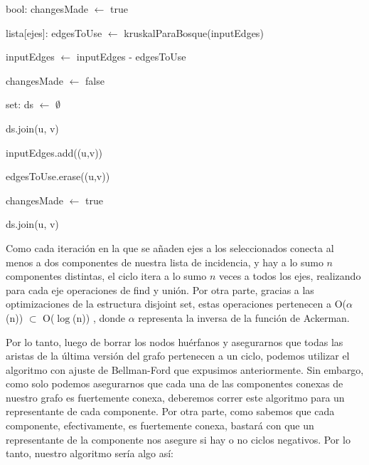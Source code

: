 \begin{algorithm}[H]
		\NoCaptionOfAlgo
		\caption{}
		
		bool: changesMade $\leftarrow$ true
		
		lista[ejes]: edgesToUse $\leftarrow$ kruskalParaBosque(inputEdges)

		inputEdges $\leftarrow$ inputEdges - edgesToUse

		{
			changesMade $\leftarrow$ false

			set: ds $\leftarrow$ $\emptyset$

			{
				ds.join(u, v)
			}

			{
					{
						inputEdges.add((u,v))

						edgesToUse.erase((u,v))

						changesMade $\leftarrow$ true
					}
					{
						ds.join(u, v)
					}
			}



		}
	\end{algorithm}
	
\par
Como cada iteración en la que se añaden ejes a los seleccionados conecta al menos a dos componentes de nuestra lista de incidencia, y hay a lo sumo $n$ componentes distintas, el ciclo itera a lo sumo $n$ veces a todos los ejes, realizando para cada eje operaciones de find y unión. Por otra parte, gracias a las optimizaciones de la estructura disjoint set, estas operaciones pertenecen a O($\alpha$(n)) $\subset$ O($\log$(n)) , donde $\alpha$ representa la inversa de la función de Ackerman.
\\
\par
Por lo tanto, luego de borrar los nodos huérfanos y asegurarnos que todas las aristas de la última versión del grafo pertenecen a un ciclo, podemos utilizar el algoritmo con ajuste de Bellman-Ford que expusimos anteriormente. Sin embargo, como solo podemos asegurarnos que cada una de las componentes conexas de nuestro grafo es fuertemente conexa, deberemos correr este algoritmo para un representante de cada componente. Por otra parte, como sabemos que cada componente, efectivamente, es fuertemente conexa, bastará con que un representante de la componente nos asegure si hay o no ciclos negativos. Por lo tanto, nuestro algoritmo sería algo así:

